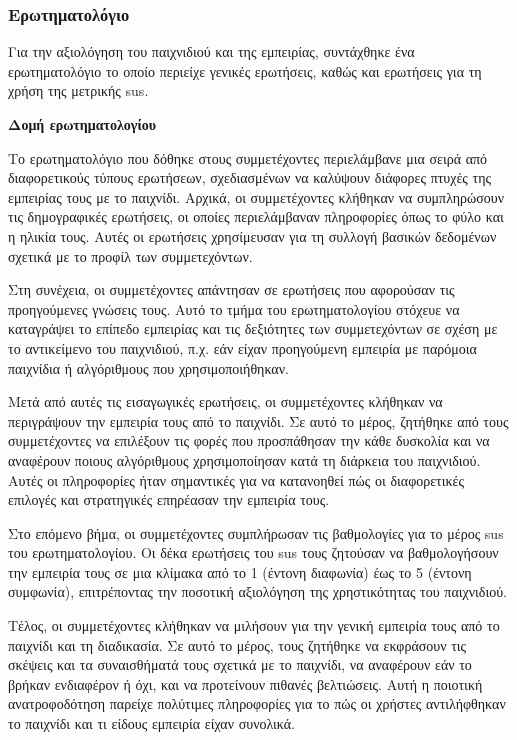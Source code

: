 
\subsubsection{Ερωτηματολόγιο}

Για την αξιολόγηση του παιχνιδιού και της εμπειρίας, συντάχθηκε ένα ερωτηματολόγιο το οποίο περιείχε γενικές ερωτήσεις, καθώς και ερωτήσεις για τη χρήση της μετρικής \acrfull{sus}\cite{noauthor_system_2024}.

\textbf{Δομή ερωτηματολογίου}

Το ερωτηματολόγιο που δόθηκε στους συμμετέχοντες περιελάμβανε μια σειρά από διαφορετικούς τύπους ερωτήσεων, σχεδιασμένων να καλύψουν διάφορες πτυχές της εμπειρίας τους με το παιχνίδι. Αρχικά, οι συμμετέχοντες κλήθηκαν να συμπληρώσουν τις δημογραφικές ερωτήσεις, οι οποίες περιελάμβαναν πληροφορίες όπως το φύλο και η ηλικία τους. Αυτές οι ερωτήσεις χρησίμευσαν για τη συλλογή βασικών δεδομένων σχετικά με το προφίλ των συμμετεχόντων.

Στη συνέχεια, οι συμμετέχοντες απάντησαν σε ερωτήσεις που αφορούσαν τις προηγούμενες γνώσεις τους. Αυτό το τμήμα του ερωτηματολογίου στόχευε να καταγράψει το επίπεδο εμπειρίας και τις δεξιότητες των συμμετεχόντων σε σχέση με το αντικείμενο του παιχνιδιού, π.χ. εάν είχαν προηγούμενη εμπειρία με παρόμοια παιχνίδια ή αλγόριθμους που χρησιμοποιήθηκαν.

Μετά από αυτές τις εισαγωγικές ερωτήσεις, οι συμμετέχοντες κλήθηκαν να περιγράψουν την εμπειρία τους από το παιχνίδι. Σε αυτό το μέρος, ζητήθηκε από τους συμμετέχοντες να επιλέξουν τις φορές που προσπάθησαν την κάθε δυσκολία και να αναφέρουν ποιους αλγόριθμους χρησιμοποίησαν κατά τη διάρκεια του παιχνιδιού. Αυτές οι πληροφορίες ήταν σημαντικές για να κατανοηθεί πώς οι διαφορετικές επιλογές και στρατηγικές επηρέασαν την εμπειρία τους.

Στο επόμενο βήμα, οι συμμετέχοντες συμπλήρωσαν τις βαθμολογίες για το μέρος \acrshort{sus} του ερωτηματολογίου. Οι δέκα ερωτήσεις του \acrshort{sus} τους ζητούσαν να βαθμολογήσουν την εμπειρία τους σε μια κλίμακα από το 1 (έντονη διαφωνία) έως το 5 (έντονη συμφωνία), επιτρέποντας την ποσοτική αξιολόγηση της χρηστικότητας του παιχνιδιού.

Τέλος, οι συμμετέχοντες κλήθηκαν να μιλήσουν για την γενική εμπειρία τους από το παιχνίδι και τη διαδικασία. Σε αυτό το μέρος, τους ζητήθηκε να εκφράσουν τις σκέψεις και τα συναισθήματά τους σχετικά με το παιχνίδι, να αναφέρουν εάν το βρήκαν ενδιαφέρον ή όχι, και να προτείνουν πιθανές βελτιώσεις. Αυτή η ποιοτική ανατροφοδότηση παρείχε πολύτιμες πληροφορίες για το πώς οι χρήστες αντιλήφθηκαν το παιχνίδι και τι είδους εμπειρία είχαν συνολικά.

